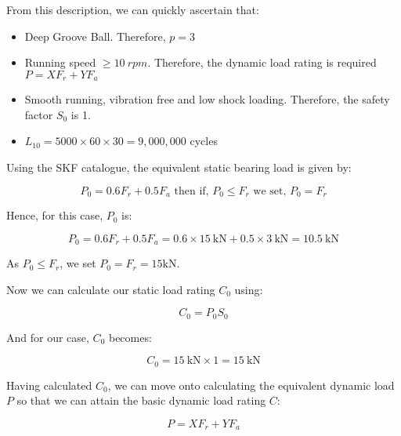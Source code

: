 From this description, we can quickly ascertain that:

\begin{itemize}
  \item Deep Groove Ball. Therefore, \(p=3\)
  \item Running speed \(\ge \SI{10}{rpm}\). Therefore, the dynamic load rating is required \(P=XF_r+YF_a\)
  \item Smooth running, vibration free and low shock loading. Therefore, the safety factor \(S_0\) is 1.
  \item \(L_{10} = 5000 \times 60 \times 30 = 9,000,000\) cycles 
\end{itemize}

 Using the SKF catalogue, the equivalent static bearing load is given by:

\begin{equation}
  P_0 = 0.6F_r+0.5F_a \text{ then if, } P_0 \le F_r \text{ we set, }P_0 = F_r
\end{equation}

\noindent{} Hence, for this case, \(P_0\) is:

\begin{equation}
  P_0=0.6F_r+0.5F_a = 0.6\times\SI{15}{\kilo\newton} + 0.5\times\SI{3}{\kilo\newton} = \SI{10.5}{\kilo\newton}
\end{equation}

\noindent{} As \(P_0 \le F_r \), we set \(P_0 = F_r = 15\si{\kilo\newton} \).

Now we can calculate our static load rating \(C_0\) using:

\begin{equation}
  C_0=P_0S_0
\end{equation}

\noindent{} And for our case, \(C_0\) becomes:

\begin{equation}
  C_0= \SI{15}{\kilo\newton} \times 1 = \SI{15}{\kilo\newton}
\end{equation}


Having calculated \(C_0\), we can move onto calculating the equivalent dynamic load \(P\) so that we can attain the basic dynamic load rating \(C\):

\begin{equation}
  P = XF_r + YF_a
\end{equation}

